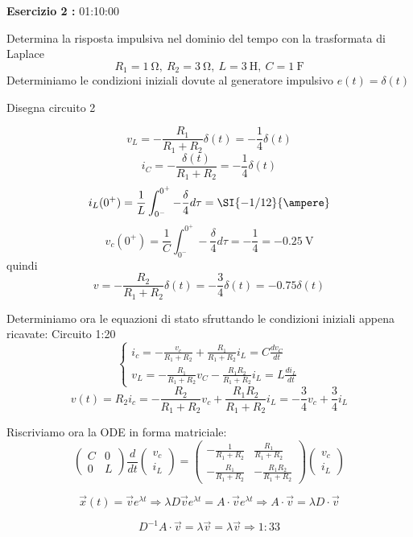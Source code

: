 \textbf{Esercizio 2 :} 01:10:00

Determina la risposta impulsiva nel dominio del tempo con la trasformata di Laplace
$$
R_1 = \SI{1}{\ohm},\ R_2 = \SI{3}{\ohm},\ L = \SI{3}{\henry},\ C = \SI{1}{\farad}
$$
Determiniamo le condizioni iniziali dovute al generatore impulsivo $e(t) = \delta(t)$

Disegna circuito 2

$$
v_L = -\frac{R_1}{R_1+R_2}\delta(t) = -\frac{1}{4}\delta(t)
$$
$$
i_C = -\frac{\delta(t)}{R_1+R_2} = -\frac{1}{4}\delta(t)
$$
$$
i_L(0^+) = \frac{1}{L} \int_{0^-}^{0^+} -\frac{\delta}{4}d\tau = \SI{-1/12}{\ampere} 
$$
$$
v_c(0^+) = \frac{1}{C} \int_{0^-}^{0^+}-\frac{\delta}{4}d\tau = -\frac{1}{4} = \SI{-0.25}{\volt}
$$
quindi
$$
v = -\frac{R_2}{R_1+R_2}\delta(t) = -\frac{3}{4}\delta(t) = -0.75\delta(t)
$$

Determiniamo ora le  equazioni di stato sfruttando le condizioni iniziali appena ricavate:
Circuito 1:20
$$
\begin{cases}
i_c = -\frac{v_c}{R_1+R_2} +\frac{R_1}{R_1+R_2}i_L = C\frac{dv_C}{dt}\\
v_L = -\frac{R_1}{R_1+R_2}v_C - \frac{R_1R_2}{R_1+R_2}i_L = L\frac{di_L}{dt}
\end{cases}
$$
$$
v(t) = R_2i_c = -\frac{R_2}{R_1+R_2}v_c + \frac{R_1R_2}{R_1+R_2}i_L = -\frac{3}{4}v_c +\frac{3}{4}i_L
$$

Riscriviamo ora la ODE in forma matriciale:
$$
\begin{pmatrix}
 C & 0 \\
 0 & L
\end{pmatrix}
\frac{d}{dt}
\begin{pmatrix}
v_c \\
i_L
\end{pmatrix}
=
\begin{pmatrix}
-\frac{1}{R_1+R_2} & \frac{R_1}{R_1+R_2}\\
-\frac{R_1}{R_1+R_2} & -\frac{R_1R_2}{R_1+R_2}
\end{pmatrix}
\begin{pmatrix}
v_c \\
i_L
\end{pmatrix}
$$

$$
\vec{x}(t) = \vec{v}e^{\lambda t} \Rightarrow \lambda D \vec{v} e ^{\lambda t} = A\cdot \vec{v}e^{\lambda t} \Rightarrow A\cdot \vec{v} = \lambda D\cdot\vec{v}
$$

$$
D^{-1}A\cdot\vec{v} = \lambda\vec{v} = \lambda\vec{v} \Rightarrow 1:33
$$

